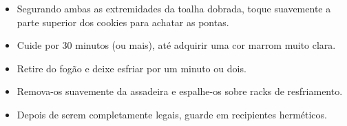 \documentclass [11pt, letterpaper] {article}
\begin{document}
\begin {description}
\begin {enumerate}
\begin {itemize}
\item Segurando ambas as extremidades da toalha dobrada, toque suavemente a parte superior dos cookies para achatar as pontas.
\item Cuide por 30 minutos (ou mais), até adquirir uma cor marrom muito clara.
\item Retire do fogão e deixe esfriar por um minuto ou dois.
\item Remova-os suavemente da assadeira e espalhe-os sobre racks de resfriamento.
\item Depois de serem completamente legais, guarde em recipientes herméticos.
\end {itemize}
\end {enumerate}

\end {description}
\end{document}
